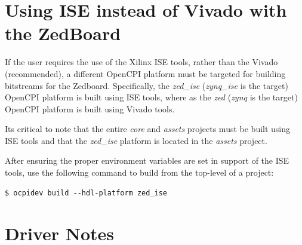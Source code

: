 \pagebreak
\begin{appendices}

\section{Using ISE instead of Vivado with the ZedBoard}
\begin{flushleft}
If the user requires the use of the Xilinx ISE tools, rather than the Vivado (recommended), a different OpenCPI platform must be targeted for building bitstreams for the Zedboard. Specifically, the \textit{zed\_ise} (\textit{zynq\_ise} is the target) OpenCPI platform is built using ISE tools, where as the \textit{zed} (\textit{zynq} is the target) OpenCPI platform  is built using Vivado tools.\medskip

Its critical to note that the entire \textit{core} and \textit{assets} projects must be built using ISE tools and that the \textit{zed\_ise} platform is located in the \textit{assets} project.\medskip

After ensuring the proper environment variables are set in support of the ISE tools, use the following command to build from the top-level of a project:

\begin{verbatim}
$ ocpidev build --hdl-platform zed_ise
\end{verbatim}
\end{flushleft}
\section{Driver Notes}

%
\end{appendices}

